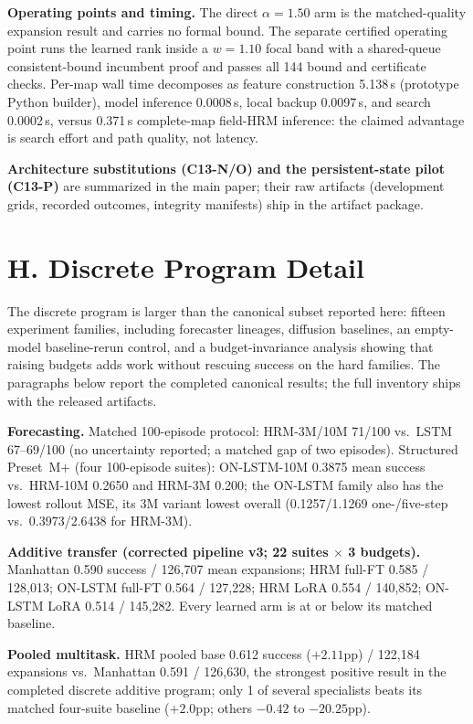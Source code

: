 \documentclass[letterpaper]{article} %
\newcommand{\stage}[1]{\textsc{#1}}
\begin{document}
\textbf{Operating points and timing.} The direct $\alpha{=}1.50$ arm is the matched-quality expansion result and carries no formal bound. The separate certified operating point runs the learned rank inside a $w{=}1.10$ focal band with a shared-queue consistent-bound incumbent proof and passes all 144 bound and certificate checks. Per-map wall time decomposes as feature construction 5.138\,s (prototype Python builder), model inference 0.0008\,s, local backup 0.0097\,s, and search 0.0002\,s, versus 0.371\,s complete-map field-HRM inference: the claimed advantage is search effort and path quality, not latency.

\textbf{Architecture substitutions (\stage{C13-N}/\stage{O}) and the persistent-state pilot (\stage{C13-P})} are summarized in the main paper; their raw artifacts (development grids, recorded outcomes, integrity manifests) ship in the artifact package.

\section{H. Discrete Program Detail}

The discrete program is larger than the canonical subset reported here: fifteen experiment families, including forecaster lineages, diffusion baselines, an empty-model baseline-rerun control, and a budget-invariance analysis showing that raising budgets adds work without rescuing success on the hard families. The paragraphs below report the completed canonical results; the full inventory ships with the released artifacts.

\textbf{Forecasting.} Matched 100-episode protocol: HRM-3M/10M 71/100 vs.\ LSTM 67--69/100 (no uncertainty reported; a matched gap of two episodes). Structured Preset~M+ (four 100-episode suites): ON-LSTM-10M 0.3875 mean success vs.\ HRM-10M 0.2650 and HRM-3M 0.200; the ON-LSTM family also has the lowest rollout MSE, its 3M variant lowest overall (0.1257/1.1269 one-/five-step vs.\ 0.3973/2.6438 for HRM-3M).

\textbf{Additive transfer (corrected pipeline v3; 22 suites $\times$ 3 budgets).} Manhattan 0.590 success / 126{,}707 mean expansions; HRM full-FT 0.585 / 128{,}013; ON-LSTM full-FT 0.564 / 127{,}228; HRM LoRA 0.554 / 140{,}852; ON-LSTM LoRA 0.514 / 145{,}282. Every learned arm is at or below its matched baseline.

\textbf{Pooled multitask.} HRM pooled base 0.612 success ($+2.11$pp) / 122{,}184 expansions vs.\ Manhattan 0.591 / 126{,}630, the strongest positive result in the completed discrete additive program; only 1 of several specialists beats its matched four-suite baseline ($+2.0$pp; others $-0.42$ to $-20.25$pp).
\end{document}
